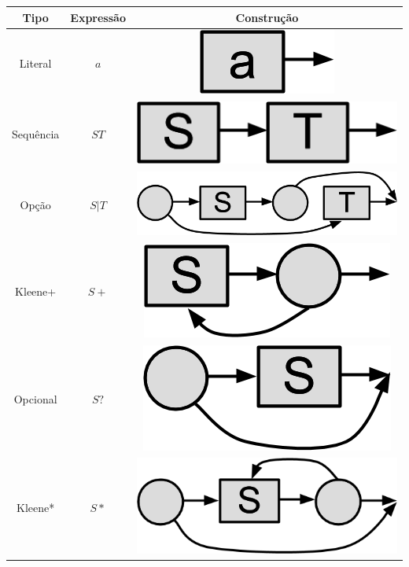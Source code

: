 \documentclass[a4paper,12pt,oneside,onecolumn]{uerj}
\begin{document}
\begin{center}
	\begin{tabular}{ c | c | c }
		{\bf Tipo} & {\bf Expressão} & {\bf Construção} \\
		\hline
		\hline
		Literal & $a$ & \includegraphics[scale=0.25]{figures/thompson_literal.png} \\ 
		\hline
		Sequência & $ST$ & \includegraphics[scale=0.25]{figures/thompson_sequence.png} \\ 
		\hline
		Opção & $S|T$ & \includegraphics[scale=0.25]{figures/thompson_option.png} \\ 
		\hline
		Kleene+ & $S+$ & \includegraphics[scale=0.25]{figures/thompson_plus.png} \\ 
		\hline
		Opcional & $S?$ & \includegraphics[scale=0.25]{figures/thompson_question.png} \\ 
		\hline
		Kleene* & $S*$ & \includegraphics[scale=0.25]{figures/thompson_kleene.png} \\ 
		\hline
	\end{tabular}
\end{center}
\end{document}
